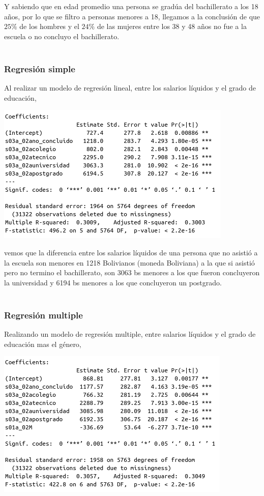 \begin{multicols}{2}
Y sabiendo que en edad promedio una persona se gradúa del bachillerato a los 18 años, por lo que se filtro a personas menores a 18, llegamos a la conclusión de que $25\%$ de los hombres y el $24\%$ de las mujeres entre los 38 y 48 años no fue a la escuela o no concluyo el bachillerato.\\\\

\subsubsection*{Regresión simple}
Al realizar un modelo de regresión lineal, entre los salarios líquidos y el grado de educación,
\begin{center}
    \includegraphics[scale = 0.6]{codigoFuente/tareas/estadistica/imagenes/reg_simp.png}
\end{center}
vemos que la diferencia entre los salarios líquidos de una persona que no asistió a la escuela son menores en 1218 Bolivianos (moneda Boliviana) a la que si asistió pero no termino el bachillerato, son 3063 bs menores a los que fueron concluyeron la universidad y 6194 bs menores a los que concluyeron un postgrado.\\\\

\subsubsection*{Regresión multiple}
Realizando un modelo de regresión multiple, entre salarios líquidos y el grado de educación mas el género,
\begin{center}
    \includegraphics[scale = 0.6]{codigoFuente/tareas/estadistica/imagenes/reg_mult.png}
\end{center}


\end{multicols}
